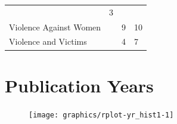 \documentclass[]{tufte-handout}
\newenvironment{Shaded}{}{}
\newcommand{\StringTok}[1]{{#1}}
\newcommand{\NormalTok}[1]{{#1}}
\begin{document}
\begin{longtable}[]{@{}llll@{}}
\begin{minipage}[t]{0.06\columnwidth}
\end{minipage} & \begin{minipage}[t]{0.06\columnwidth}\raggedright\strut
3\strut
\end{minipage}\tabularnewline
\begin{minipage}[t]{0.53\columnwidth}\raggedright\strut
Violence Against Women\strut
\end{minipage} & \begin{minipage}[t]{0.09\columnwidth}\raggedright\strut
\strut
\end{minipage} & \begin{minipage}[t]{0.06\columnwidth}\raggedright\strut
9\strut
\end{minipage} & \begin{minipage}[t]{0.06\columnwidth}\raggedright\strut
10\strut
\end{minipage}\tabularnewline
\begin{minipage}[t]{0.53\columnwidth}\raggedright\strut
Violence and Victims\strut
\end{minipage} & \begin{minipage}[t]{0.09\columnwidth}\raggedright\strut
\strut
\end{minipage} & \begin{minipage}[t]{0.06\columnwidth}\raggedright\strut
4\strut
\end{minipage} & \begin{minipage}[t]{0.06\columnwidth}\raggedright\strut
7\strut
\end{minipage}\tabularnewline
\bottomrule
\end{longtable}

\begin{Shaded}
\end{Shaded}

\section{Publication Years}\label{publication-years}

\begin{figure}
\texttt{[image: graphics/rplot-yr\_hist1-1]} \end{figure}
\end{document}
